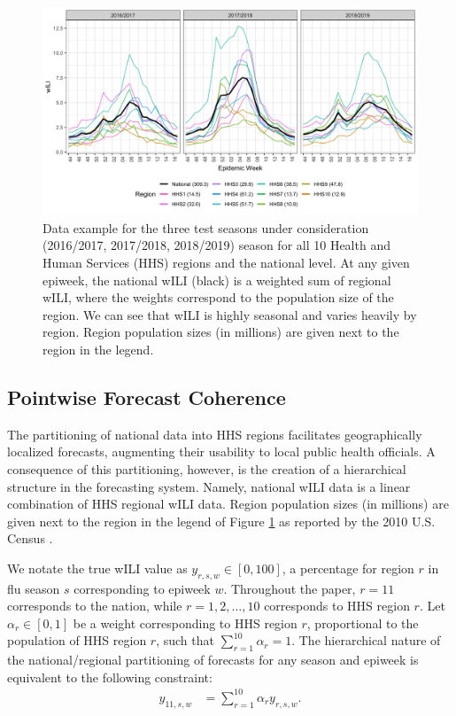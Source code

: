 \documentclass{umassthesis}          %
\begin{document}
  \begin{figure}
  \centering
  \includegraphics[scale=.2]{data_fig.png}
\caption{Data example for the three test seasons under consideration (2016/2017, 2017/2018, 2018/2019) season for all 10 Health and Human Services (HHS) regions and the national level. At any given epiweek, the national wILI (black) is a weighted sum of regional wILI, where the weights correspond to the population size of the region. We can see that wILI is highly seasonal and varies heavily by region. Region population sizes (in millions) are given next to the region in the legend. }
\label{fig:dgp}
\end{figure}

\subsection{Pointwise Forecast Coherence}



\label{sec:coherence}
The partitioning of national data into HHS regions facilitates geographically localized forecasts, augmenting their usability to local public health officials. A consequence of this partitioning, however, is the creation of a hierarchical structure in the forecasting system. Namely, national wILI data is a linear combination of HHS regional wILI data. Region population sizes (in millions) are given next to the region in the legend of Figure \ref{fig:dgp} as reported by the 2010 U.S. Census \cite{census}.  

We notate the true wILI value as $y_{r,s,w} \in [0,100]$, a percentage for region $r$ in flu season $s$ corresponding to epiweek $w$. Throughout the paper, $r=11$ corresponds to the nation, while $r = 1,2,\ldots,10$ corresponds to HHS region $r$. Let $\alpha_r \in [0,1]$ be a weight corresponding to HHS region $r$, proportional to the population of HHS region $r$, such that  $\sum_{r=1}^{10} \alpha_r =1$. The hierarchical nature of the national/regional partitioning of forecasts for any season and epiweek is equivalent to the following constraint:
\begin{align}
y_{11,s,w} &= \sum_{r=1}^{10} \alpha_r y_{r,s,w}.
\end{align}
\end{document}
